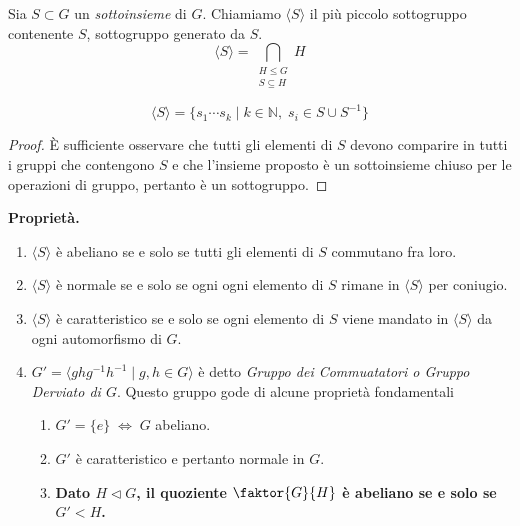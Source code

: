 \begin{multicols}{2}
\begin{definition}
	Sia $ S \subset G $ un \emph{sottoinsieme} di $ G $. Chiamiamo $ \langle S \rangle $ il più piccolo sottogruppo contenente $ S $, sottogruppo generato da $ S $. \[ \langle S \rangle = \bigcap_{\substack{H \leq G \\ S \subseteq H }} H  \]
\end{definition}
\begin{prop}
	\[ \langle S \rangle = \{ s_1 \cdots s_k \mid k \in \mathbb{N}, \; s_i \in S \cup S^{-1} \} \]
\end{prop}
\begin{proof}
	\`{E} sufficiente osservare che tutti gli elementi di $ S $ devono comparire in tutti i gruppi che contengono $ S $ e che l'insieme proposto è un sottoinsieme chiuso per le operazioni di gruppo, pertanto è un sottogruppo.
\end{proof}

\textbf{Proprietà.}
\begin{enumerate}
	\item $ \langle S \rangle $ è abeliano se e solo se tutti gli elementi di $ S $ commutano fra loro.
	\item $ \langle S \rangle $ è normale se e solo se ogni ogni elemento di $ S $ rimane in $ \langle S \rangle $ per coniugio.
	\item $ \langle S \rangle $ è caratteristico se e solo se ogni elemento di $ S $ viene mandato in $ \langle S \rangle $ da ogni automorfismo di $ G $.
	\item $ G' = \langle ghg^{-1}h^{-1} \mid g, h \in G \rangle $ è detto \emph{Gruppo dei Commuatatori o Gruppo Derviato di $ G $}. Questo gruppo gode di alcune proprietà fondamentali
	
	\begin{enumerate}
		\item $ G' = \{ e \} \;\Leftrightarrow\; G $ abeliano.
		\item $ G' $ è caratteristico e pertanto normale in $ G $.
		\item \textbf{Dato $ H \lhd G $, il quoziente $ \faktor{G}{H} $ è abeliano se e solo se $ G' < H $.}
	
		
	\end{enumerate}


\end{enumerate}
\end{multicols}
